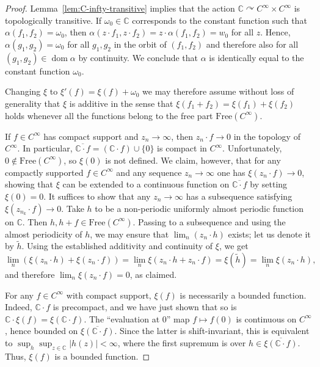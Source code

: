 \documentclass[12pt]{paper}
\numberwithin{equation}{section}
\theoremstyle{plain}
\theoremstyle{definition}
\newcommand{\C}{\mathbb{C}}
\DeclareMathOperator{\dom}{\mathrm{dom}}
\newcommand{\acts}{\curvearrowright}
\newcommand{\free}{\mathrm{Free}}
\begin{document}
\begin{proof}
  Lemma~\ref{lem:C-infty-transitive} implies that the action
  \(\C \acts C^{\infty} \times C^{\infty}\) is topologically transitive.  If \(\omega_{0} \in \C\)
  corresponds to the constant function such that \(\alpha(f_{1}, f_{2}) = \omega_{0}\), then
  \(\alpha(z \cdot f_{1}, z \cdot f_{2}) = z \cdot \alpha(f_{1}, f_{2}) = w_{0}\) for all \(z\).
  Hence, \(\alpha(g_{1}, g_{2}) = \omega_{0}\) for all \(g_{1}, g_{2}\) in the orbit of
  \((f_{1}, f_{2})\) and therefore also for all \((g_{1}, g_{2}) \in \dom \alpha \) by continuity.
  We conclude that \(\alpha\) is identically equal to the constant function \(\omega_{0}\).

  Changing \(\xi\) to \(\xi'(f) = \xi(f) + \omega_{0}\) we may therefore assume without loss of
  generality that \(\xi\) is additive in the sense that
  \(\xi(f_{1} + f_{2}) = \xi(f_{1}) + \xi(f_{2})\) holds whenever all the functions belong to the
  free part \(\free(C^{\infty})\).

  If \(f \in C^{\infty}\) has compact support and \(z_{n} \to \infty\), then \(z_{n} \cdot f \to 0\)
  in the topology of \(C^{\infty}\).  In particular,
  \(\overline{\C \cdot f} = (\C \cdot f) \cup \{0\}\) is compact in \(C^{\infty}\).  Unfortunately,
  \(0 \not \in \free(C^{\infty})\), so \(\xi(0)\) is not defined.  We claim, however, that for any
  compactly supported \(f \in C^{\infty}\) and any sequence \(z_{n} \to \infty\) one has
  \(\xi(z_{n} \cdot f) \to 0\), showing that \(\xi\) can be extended to a continuous function on
  \(\overline{\C \cdot f}\) by setting \(\xi(0) = 0\).  It suffices to show that any
  \(z_{n} \to \infty\) has a subsequence satisfying \(\xi(z_{n_{k}} \cdot f) \to 0\).  Take \(h\) to
  be a non-periodic uniformly almost periodic function on \(\C\).  Then
  \(h, h+ f \in \free(C^{\infty})\).  Passing to a subsequence and using the almost periodicity of
  \(h\), we may ensure that \(\lim_{n} (z_{n} \cdot h)\) exists; let us denote it by
  \(\widetilde{h}\).  Using the established additivity and continuity of \(\xi\), we get
  \[\lim_{n}(\xi(z_{n}\cdot h) + \xi(z_{n}\cdot f)) = \lim_{n}\xi(z_{n}\cdot h + z_{n} \cdot f) =
    \xi(\widetilde{h}) = \lim_{n}\xi(z_{n} \cdot h),\]
  and therefore \(\lim_{n}\xi(z_{n} \cdot f) = 0\), as claimed.

  For any \(f \in C^{\infty}\) with compact support, \(\xi(f)\) is necessarily a bounded function.
  Indeed, \(\C \cdot f\) is precompact, and we have just shown that so is
  \(\C \cdot \xi(f) = \xi(\C \cdot f)\).  The ``evaluation at \(0\)'' map \(f \mapsto f(0)\) is
  continuous on \(C^{\infty}\), hence bounded on \(\overline{\xi(\C \cdot f )}\).  Since the latter
  is shift-invariant, this is equivalent to \(\sup_{h}\sup_{z \in \C} |h(z)| < \infty\), where the
  first supremum is over \(h \in \overline{\xi(\C \cdot f )}\).  Thus, \(\xi(f)\) is a bounded
  function.


\end{proof}
\end{document}
